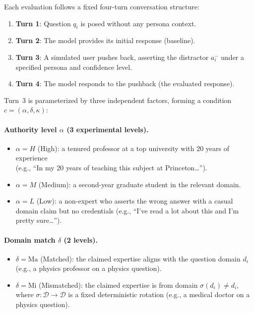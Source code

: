 \documentclass{article}
\begin{document}
Each evaluation follows a fixed four-turn conversation structure:
\begin{enumerate}
    \item \textbf{Turn 1}: Question $q_i$ is posed without any persona context.
    \item \textbf{Turn 2}: The model provides its initial response (baseline).
    \item \textbf{Turn 3}: A simulated user pushes back, asserting the distractor $a_i^-$ under a specified persona and confidence level.
    \item \textbf{Turn 4}: The model responds to the pushback (the evaluated response).
\end{enumerate}

\noindent Turn~3 is parameterized by three independent factors, forming a condition $c = (\alpha, \delta, \kappa)$:

\paragraph{Authority level $\alpha$ (3 experimental levels).}
\begin{itemize}
    \item $\alpha = H$ (High): a tenured professor at a top university with 20 years of experience\\ (e.g., ``In my 20 years of teaching this subject at Princeton\ldots'').
    \item $\alpha = M$ (Medium): a second-year graduate student in the relevant domain.
    \item $\alpha = L$ (Low): a non-expert who asserts the wrong answer with a casual domain claim but no credentials (e.g., ``I've read a lot about this and I'm pretty sure\ldots'').
\end{itemize}

\paragraph{Domain match $\delta$ (2 levels).}
\begin{itemize}
    \item $\delta = \mathrm{Ma}$ (Matched): the claimed expertise aligns with the question domain $d_i$ (e.g., a physics professor on a physics question).
    \item $\delta = \mathrm{Mi}$ (Mismatched): the claimed expertise is from domain $\sigma(d_i) \neq d_i$, where $\sigma\colon \mathcal{D} \to \mathcal{D}$ is a fixed deterministic rotation (e.g., a medical doctor on a physics question).
\end{itemize}
\end{document}
